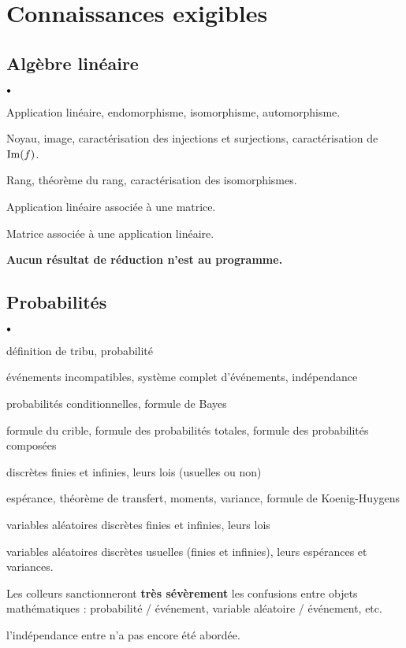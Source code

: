 \documentclass[11pt]{article}%
\begin{document}
\section*{Connaissances exigibles}

\subsection*{Algèbre linéaire}

\begin{noliste}{$\scriptstyle \bullet$}
  \item Application linéaire, endomorphisme, isomorphisme, 
  automorphisme.
\item Noyau, image, caractérisation des injections et surjections, 
caractérisation de $\operatorname{Im}(f)$.
\item Rang, théorème du rang, caractérisation des isomorphismes.
\item Application linéaire associée à une matrice.
\item Matrice associée à une application linéaire.
\item {\bf Aucun résultat de réduction n'est au programme.}
\end{noliste}




\subsection*{Probabilités}

\begin{noliste}{$\scriptstyle \bullet$}
\item définition de tribu, probabilité
\item événements incompatibles, système complet d'événements, 
indépendance
\item probabilités conditionnelles, formule de Bayes
\item formule du crible, formule des probabilités totales, formule des 
probabilités composées
\item \var discrètes finies et infinies, leurs lois (usuelles ou non)
\item espérance, théorème de transfert, moments, variance, formule de 
Koenig-Huygens
\item variables aléatoires discrètes finies et infinies, leurs lois
\item variables aléatoires discrètes usuelles (finies et infinies), 
leurs espérances et variances.
\item Les colleurs sanctionneront {\bf très sévèrement} les confusions 
entre objets mathématiques : probabilité / événement, variable aléatoire 
/ événement, etc.
\item l'indépendance entre \var n'a pas encore été abordée.
\end{noliste}
\end{document}
